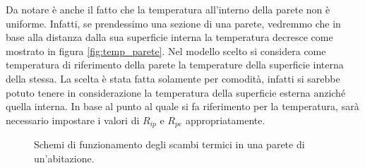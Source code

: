 \documentclass[laurea,oneside,11pt]{USiena_tesiLM}
\begin{document}
Da notare è anche il fatto che la temperatura all'interno della parete non è uniforme. Infatti, se prendessimo una sezione di una parete, vedremmo che in base alla distanza dalla sua superficie interna la temperatura decresce come mostrato in figura \ref{fig:temp_parete}.  Nel modello scelto si considera come temperatura di riferimento della parete la temperature della superficie interna della stessa. La scelta è stata fatta solamente per comodità, infatti si sarebbe potuto tenere in considerazione la temperatura della superficie esterna anziché quella interna. In base al punto al quale si fa riferimento per la temperatura, sarà necessario impostare  i valori di $R_{ip}$ e $R_{pe}$ appropriatamente.   

 \begin{figure}[!ht]
 \centering
 \hspace{5mm}
 \caption{Schemi di funzionamento degli scambi termici in una parete di un'abitazione.}
 \end{figure}
\end{document}
